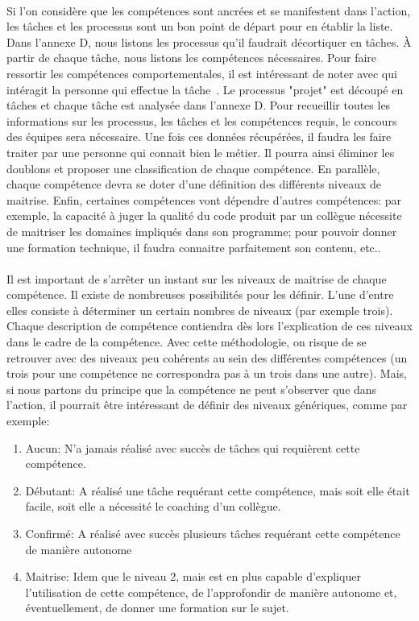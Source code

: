 \paragraph{}Si l'on considère que les compétences sont ancrées et se manifestent dans l'action, les tâches et les processus sont un bon point de départ pour en établir la liste.  Dans l'annexe D, nous listons les processus qu'il faudrait décortiquer en tâches. À partir de chaque tâche, nous listons les compétences nécessaires. Pour faire ressortir les compétences comportementales, il est intéressant de noter avec qui intéragit la personne qui effectue la tâche~\citep[pp. 185]{refcompetence}. Le processus "projet" est découpé en tâches et chaque tâche est analysée dans l'annexe D. Pour recueillir toutes les informations sur les processus, les tâches et les compétences requis, le concours des équipes sera nécessaire. Une fois ces données récupérées, il faudra les faire traiter par une personne qui connait bien le métier. Il pourra ainsi éliminer les doublons et proposer une classification de chaque compétence. En parallèle, chaque compétence devra se doter d'une définition des différents niveaux de maitrise. Enfin, certaines compétences vont dépendre d'autres compétences: par exemple, la capacité à juger la qualité du code produit par un collègue nécessite de maitriser les domaines impliqués dans son programme; pour pouvoir donner une formation technique, il faudra connaitre parfaitement son contenu, etc.. 

\paragraph{} Il est important de s'arrêter un instant sur les niveaux de maitrise de chaque compétence. Il existe de nombreuses possibilités pour les définir. L'une d'entre elles consiste à déterminer un certain nombres de niveaux (par exemple trois). Chaque description de compétence contiendra dès lors l'explication de ces niveaux dans le cadre de la compétence. Avec cette méthodologie, on risque de se retrouver avec des niveaux peu cohérents au sein des différentes compétences (un trois pour une compétence ne correspondra pas à un trois dans une autre). Mais, si nous partons du principe que la compétence ne peut s'observer que dans l'action, il pourrait être intéressant de définir des niveaux génériques, comme par exemple: 
\begin{enumerate}
  \item Aucun: N'a jamais réalisé avec succès de tâches qui requièrent cette compétence.
  \item Débutant: A réalisé une tâche requérant cette compétence, mais soit elle était facile, soit elle a nécessité le coaching d'un collègue. 
  \item Confirmé: A réalisé avec succès plusieurs tâches requérant cette compétence de manière autonome
  \item Maitrise: Idem que le niveau 2, mais est en plus capable d'expliquer l'utilisation de cette compétence, de l'approfondir de manière autonome et, éventuellement, de donner une formation sur le sujet.
\end{enumerate}
